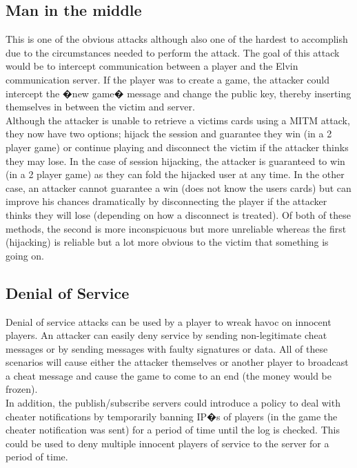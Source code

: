 \documentclass[11pt, oneside]{article}   	%
\begin{document}
\subsection{Man in the middle}

This is one of the obvious attacks although also one of the hardest to accomplish due to the circumstances needed to perform the attack. The goal of this attack would be to intercept communication between a player and the Elvin communication server. If the player was to create a game, the attacker could intercept the �new game� message and change the public key, thereby inserting themselves in between the victim and server.\\

Although the attacker is unable to retrieve a victims cards using a MITM attack, they now have two options; hijack the session and guarantee they win (in a 2 player game) or continue playing and disconnect the victim if the attacker thinks they may lose. In the case of session hijacking, the attacker is guaranteed to win (in a 2 player game) as they can fold the hijacked user at any time. In the other case, an attacker cannot guarantee a win (does not know the users cards) but can improve his chances dramatically by disconnecting the player if the attacker thinks they will lose (depending on how a disconnect is treated). Of both of these methods, the second is more inconspicuous but more unreliable whereas the first (hijacking) is reliable but a lot more obvious to the victim that something is going on.\\

\subsection{Denial of Service}

Denial of service attacks can be used by a player to wreak havoc on innocent players. An attacker can easily deny service by sending non-legitimate cheat messages or by sending messages with faulty signatures or data. All of these scenarios will cause either the attacker themselves or another player to broadcast a cheat message and cause the game to come to an end (the money would be frozen).\\

In addition, the publish/subscribe servers could introduce a policy to deal with cheater notifications by temporarily banning IP�s of players (in the game the cheater notification was sent) for a period of time until the log is checked. This could be used to deny multiple innocent players of service to the server for a period of time.\\
\end{document}
